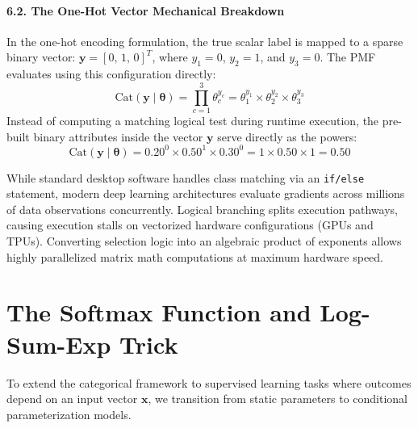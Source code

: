 \documentclass{article}
\begin{document}
\paragraph{6.2. The One-Hot Vector Mechanical Breakdown}
In the one-hot encoding formulation, the true scalar label is mapped to a sparse binary vector: $\boldsymbol{y} = [0, \, 1, \, 0]^T$, where $y_1=0$, $y_2=1$, and $y_3=0$. The PMF evaluates using this configuration directly:
\begin{equation}
    \text{Cat}(\boldsymbol{y} \mid \boldsymbol{\theta}) = \prod_{c=1}^{3} \theta_c^{y_c} = \theta_1^{y_1} \times \theta_2^{y_2} \times \theta_3^{y_3}
\end{equation}
Instead of computing a matching logical test during runtime execution, the pre-built binary attributes inside the vector $\boldsymbol{y}$ serve directly as the powers:
\begin{equation}
    \text{Cat}(\boldsymbol{y} \mid \boldsymbol{\theta}) = 0.20^0 \times 0.50^1 \times 0.30^0 = 1 \times 0.50 \times 1 = \mathbf{0.50}
\end{equation}

\begin{tcolorbox}[colback=blue!5!white, colframe=blue!60!black, title=Why Avoid Conditional Code Branching?]
While standard desktop software handles class matching via an \texttt{if/else} statement, modern deep learning architectures evaluate gradients across millions of data observations concurrently. Logical branching splits execution pathways, causing execution stalls on vectorized hardware configurations (GPUs and TPUs). Converting selection logic into an algebraic product of exponents allows highly parallelized matrix math computations at maximum hardware speed.
\end{tcolorbox}

\section*{The Softmax Function and Log-Sum-Exp Trick}

To extend the categorical framework to supervised learning tasks where outcomes depend on an input vector $\boldsymbol{x}$, we transition from static parameters to conditional parameterization models.
\end{document}
